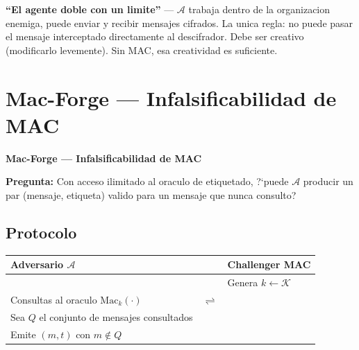 \documentclass[a4paper,11pt]{article}
\begin{document}
\begin{hookbox}
\textbf{``El agente doble con un limite''} --- $\mathcal{A}$ trabaja dentro de la organizacion enemiga, puede enviar y recibir mensajes cifrados. La unica regla: no puede pasar el mensaje interceptado directamente al descifrador. Debe ser creativo (modificarlo levemente). Sin MAC, esa creatividad es suficiente.
\end{hookbox}

\section{Mac-Forge --- Infalsificabilidad de MAC}

\begin{tcolorbox}[
  enhanced, breakable,
  colback=white, colframe=itbaAmber,
  borderline west={3pt}{0pt}{itbaAmber},
  sharp corners, drop shadow,
  top=4mm, left=4mm, right=4mm, bottom=4mm,
]
{\color{itbaAmber}\large\bfseries Mac-Forge --- Infalsificabilidad de MAC}\par\vspace{4pt}
\textbf{Pregunta:} Con acceso ilimitado al oraculo de etiquetado, ?`puede $\mathcal{A}$ producir un par (mensaje, etiqueta) valido para un mensaje que nunca consulto?
\end{tcolorbox}

\vspace{0.5cm}

\subsection{Protocolo}

\begin{center}
\begin{tabular}{ACB}
\toprule
\textbf{Adversario $\mathcal{A}$} & & \textbf{Challenger MAC} \\
\midrule
 & & Genera $k \leftarrow \mathcal{K}$ \\
Consultas al oraculo $\mathrm{Mac}_k(\cdot)$ & $\rightleftharpoons$ & \\
Sea $Q$ el conjunto de mensajes consultados & & \\
Emite $(m, t)$ con $m \notin Q$ & & \\
\bottomrule
\end{tabular}
\end{center}
\end{document}
